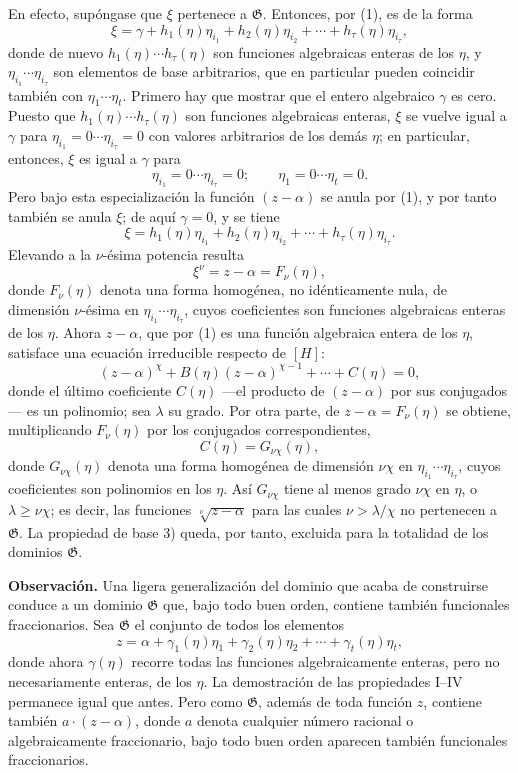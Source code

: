 \documentclass[11pt]{article}
\begin{document}
En efecto, supóngase que $\xi$ pertenece a $\mathfrak G$. Entonces, por (1), es de la forma
\[
 \xi=\gamma+h_1(\eta)\eta_{i_1}+h_2(\eta)\eta_{i_2}
      +\cdots+h_\tau(\eta)\eta_{i_\tau},
\]
donde de nuevo $h_1(\eta)\cdots h_\tau(\eta)$ son funciones algebraicas enteras de los $\eta$, y $\eta_{i_1}\cdots\eta_{i_\tau}$ son elementos de base arbitrarios, que en particular pueden coincidir también con $\eta_1\cdots\eta_t$. Primero hay que mostrar que el entero algebraico $\gamma$ es cero. Puesto que $h_1(\eta)\cdots h_\tau(\eta)$ son funciones algebraicas enteras, $\xi$ se vuelve igual a $\gamma$ para
$\eta_{i_1}=0\cdots\eta_{i_\tau}=0$ con valores arbitrarios de los demás $\eta$; en particular, entonces, $\xi$ es igual a $\gamma$ para
\[
 \eta_{i_1}=0\cdots \eta_{i_\tau}=0; \qquad
 \eta_1=0\cdots \eta_t=0.
\]
Pero bajo esta especialización la función $(z-\alpha)$ se anula por (1), y por tanto también se anula $\xi$; de aquí $\gamma=0$, y se tiene
\[
 \xi=h_1(\eta)\eta_{i_1}+h_2(\eta)\eta_{i_2}
      +\cdots+h_\tau(\eta)\eta_{i_\tau}.
\]
Elevando a la $\nu$-ésima potencia resulta
\[
 \xi^\nu=z-\alpha=F_\nu(\eta),
\]
donde $F_\nu(\eta)$ denota una forma homogénea, no idénticamente nula, de dimensión $\nu$-ésima en $\eta_{i_1}\cdots\eta_{i_\tau}$, cuyos coeficientes son funciones algebraicas enteras de los $\eta$. Ahora $z-\alpha$, que por (1) es una función algebraica entera de los $\eta$, satisface una ecuación irreducible respecto de $[H]$:
\[
 (z-\alpha)^\chi+B(\eta)(z-\alpha)^{\chi-1}+\cdots+C(\eta)=0,
\]
donde el último coeficiente $C(\eta)$ ---el producto de $(z-\alpha)$ por sus conjugados--- es un polinomio; sea $\lambda$ su grado. Por otra parte, de $z-\alpha=F_\nu(\eta)$ se obtiene, multiplicando $F_\nu(\eta)$ por los conjugados correspondientes,
\[
 C(\eta)=G_{\nu\chi}(\eta),
\]
donde $G_{\nu\chi}(\eta)$ denota una forma homogénea de dimensión $\nu\chi$ en $\eta_{i_1}\cdots\eta_{i_\tau}$, cuyos coeficientes son polinomios en los $\eta$. Así $G_{\nu\chi}$ tiene al menos grado $\nu\chi$ en $\eta$, o $\lambda\geq\nu\chi$; es decir, las funciones $\sqrt[\nu]{z-\alpha}$ para las cuales $\nu>\lambda/\chi$ no pertenecen a $\mathfrak G$. La propiedad de base 3) queda, por tanto, excluida para la totalidad de los dominios $\mathfrak G$.

\textbf{Observación.} Una ligera generalización del dominio que acaba de construirse conduce a un dominio $\mathfrak G$ que, bajo todo buen orden, contiene también funcionales fraccionarios. Sea $\mathfrak G$ el conjunto de todos los elementos
\[
 z=\alpha+\gamma_1(\eta)\eta_1+\gamma_2(\eta)\eta_2
      +\cdots+\gamma_t(\eta)\eta_t,
\]
donde ahora $\gamma(\eta)$ recorre todas las funciones algebraicamente enteras, pero no necesariamente enteras, de los $\eta$. La demostración de las propiedades I--IV permanece igual que antes. Pero como $\mathfrak G$, además de toda función $z$, contiene también $a\cdot(z-\alpha)$, donde $a$ denota cualquier número racional o algebraicamente fraccionario, bajo todo buen orden aparecen también funcionales fraccionarios.
\end{document}
